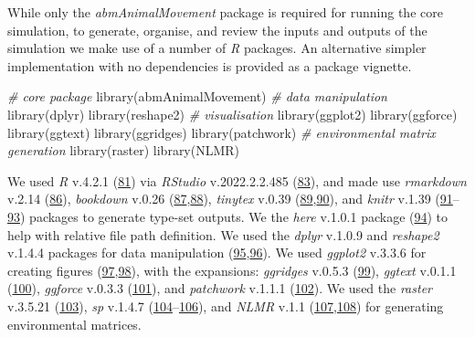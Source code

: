 \documentclass[10pt,a4paper]{article}
\newenvironment{Shaded}{}{}
\newcommand{\CommentTok}[1]{\textit{#1}}
\newcommand{\FunctionTok}[1]{#1}
\newcommand{\NormalTok}[1]{#1}
\begin{document}
While only the \emph{abmAnimalMovement} package is required for running the core simulation, to generate, organise, and review the inputs and outputs of the simulation we make use of a number of \emph{R} packages.
An alternative simpler implementation with no dependencies is provided as a package vignette.

\begin{Shaded}
\begin{Highlighting}[]
\CommentTok{\# core package}
\FunctionTok{library}\NormalTok{(abmAnimalMovement)}
\CommentTok{\# data manipulation}
\FunctionTok{library}\NormalTok{(dplyr)}
\FunctionTok{library}\NormalTok{(reshape2)}
\CommentTok{\# visualisation}
\FunctionTok{library}\NormalTok{(ggplot2)}
\FunctionTok{library}\NormalTok{(ggforce)}
\FunctionTok{library}\NormalTok{(ggtext)}
\FunctionTok{library}\NormalTok{(ggridges)}
\FunctionTok{library}\NormalTok{(patchwork)}
\CommentTok{\# environmental matrix generation}
\FunctionTok{library}\NormalTok{(raster)}
\FunctionTok{library}\NormalTok{(NLMR)}
\end{Highlighting}
\end{Shaded}

We used \emph{R} v.4.2.1 (\protect\hyperlink{ref-R-base}{81}) via \emph{RStudio} v.2022.2.2.485 (\protect\hyperlink{ref-RStudioTeam2021}{83}), and made use \emph{rmarkdown} v.2.14 (\protect\hyperlink{ref-rmarkdown2020}{86}), \emph{bookdown} v.0.26 (\protect\hyperlink{ref-bookdown2016}{87},\protect\hyperlink{ref-R-bookdown}{88}), \emph{tinytex} v.0.39 (\protect\hyperlink{ref-tinytex2019}{89},\protect\hyperlink{ref-R-tinytex}{90}), and \emph{knitr} v.1.39 (\protect\hyperlink{ref-knitr2015}{91}--\protect\hyperlink{ref-R-knitr}{93}) packages to generate type-set outputs.
We the \emph{here} v.1.0.1 package (\protect\hyperlink{ref-R-here}{94}) to help with relative file path definition.
We used the \emph{dplyr} v.1.0.9 and \emph{reshape2} v.1.4.4 packages for data manipulation (\protect\hyperlink{ref-R-dplyr}{95},\protect\hyperlink{ref-reshape22007}{96}).
We used \emph{ggplot2} v.3.3.6 for creating figures (\protect\hyperlink{ref-R-ggplot2}{97},\protect\hyperlink{ref-ggplot22016}{98}), with the expansions: \emph{ggridges} v.0.5.3 (\protect\hyperlink{ref-R-ggridges}{99}), \emph{ggtext} v.0.1.1 (\protect\hyperlink{ref-R-ggtext}{100}), \emph{ggforce} v.0.3.3 (\protect\hyperlink{ref-R-ggforce}{101}), and \emph{patchwork} v.1.1.1 (\protect\hyperlink{ref-R-patchwork}{102}).
We used the \emph{raster} v.3.5.21 (\protect\hyperlink{ref-R-raster}{103}), \emph{sp} v.1.4.7 (\protect\hyperlink{ref-sp2013}{104}--\protect\hyperlink{ref-R-sp}{106}), and \emph{NLMR} v.1.1 (\protect\hyperlink{ref-NLMR2018}{107},\protect\hyperlink{ref-R-NLMR}{108}) for generating environmental matrices.
\end{document}
